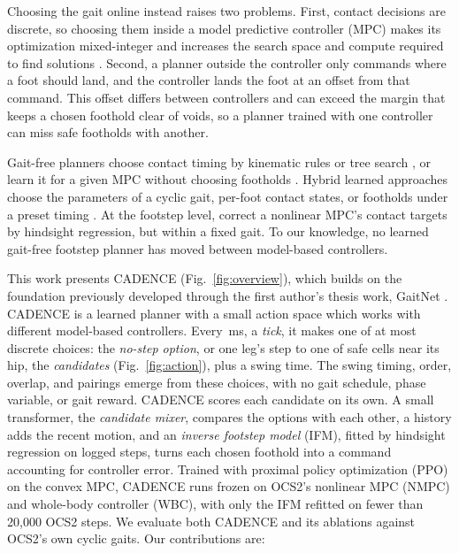 Choosing the gait online instead raises two problems.
First, contact decisions are discrete, so choosing them inside a model
predictive controller (MPC) makes its optimization mixed-integer and increases the search space and compute required to find solutions
\citep{Wensing2022Nov}. Second, a planner outside the controller only
commands where a foot should land, and the controller lands the foot at
an offset from that command. This offset differs between controllers and
can exceed the margin that keeps a chosen foothold clear of voids, so a
planner trained with one controller can miss safe footholds with
another.

 Gait-free planners choose contact timing by kinematic
rules or tree search \citep{bjelonic_whole-body_2021,
amatucci_monte_2022, taouil_non-gaited_2024}, or learn it for a given
MPC without choosing footholds \citep{patrizi_rl-augmented_2026}. 
Hybrid learned approaches choose the parameters of a cyclic gait, per-foot contact
states, or footholds under a preset timing \citep{yang_fast_2021,
margolis_learning_2021, gangapurwala_rloc_2022,
bratta_contactnet_2024}. At the footstep level,
\citet{akizhanov_learning_2024} correct a nonlinear MPC's contact
targets by hindsight regression, but within a fixed gait. To our
knowledge, no learned gait-free footstep planner has moved between
model-based controllers.


This work presents CADENCE (Fig.~\ref{fig:overview}), which builds on the 
foundation previously developed through the first author's 
thesis work, GaitNet \citep{Sullivan2025}. CADENCE is a learned planner with a small 
action space which works with different model-based controllers. Every
\corlControlTickMs\,ms, a \emph{tick}, it makes one of at most
\corlTotalCandidates{} discrete choices: the \emph{no-step option}, or
one leg's step to one of \corlTrainCandidatesPerLeg{} safe cells near
its hip, the \emph{candidates} (Fig.~\ref{fig:action}), plus a swing
time. The swing timing, order, overlap, and pairings emerge from these
choices, with no gait schedule, phase variable, or gait reward. CADENCE
scores each candidate on its own. A small transformer, the \emph{candidate mixer}, 
compares the options with each
other, a history adds the recent motion, and an \emph{inverse footstep
model} (IFM), fitted by hindsight regression on logged steps, turns each
chosen foothold into a command accounting for controller error. Trained
with proximal policy optimization (PPO) on the convex MPC, CADENCE runs
frozen on OCS2's nonlinear MPC (NMPC) and whole-body controller (WBC),
with only the IFM refitted on fewer than 20{,}000 OCS2 steps. We
evaluate both CADENCE and its ablations against OCS2's own cyclic gaits.
Our contributions are:

